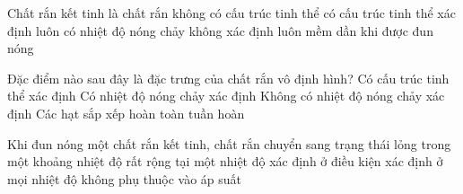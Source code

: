 
\begin{ex}
Chất rắn kết tinh là chất rắn
\choice
{không có cấu trúc tinh thể}
{\True có cấu trúc tinh thể xác định}
{luôn có nhiệt độ nóng chảy không xác định}
{luôn mềm dần khi được đun nóng}
\end{ex}





\begin{ex}
Đặc điểm nào sau đây là đặc trưng của chất rắn vô định hình?
\choice
{Có cấu trúc tinh thể xác định}
{Có nhiệt độ nóng chảy xác định}
{\True Không có nhiệt độ nóng chảy xác định}
{Các hạt sắp xếp hoàn toàn tuần hoàn}
\end{ex}



\begin{ex}
Khi đun nóng một chất rắn kết tinh, chất rắn chuyển sang trạng thái lỏng
\choice
{trong một khoảng nhiệt độ rất rộng}
{\True tại một nhiệt độ xác định ở điều kiện xác định}
{ở mọi nhiệt độ}
{không phụ thuộc vào áp suất}
\end{ex}

